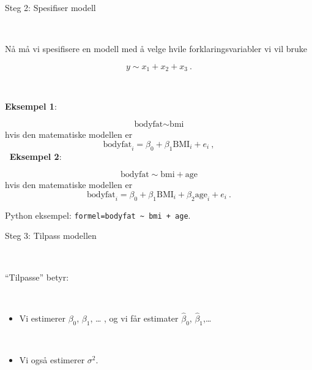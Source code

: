 \documentclass[10pt,ignorenonframetext,]{beamer}
\providecommand{\tightlist}{%
  \setlength{\itemsep}{0pt}\setlength{\parskip}{0pt}}
\begin{document}
\begin{frame}[fragile]

\begin{block}{Steg 2: Spesifiser modell}

\(~\)

Nå må vi spesifisere en modell med å velge hvile forklaringsvariabler vi
vil bruke

\[ y \sim x_1 + x_2 + x_3 \ .\]

\(~\)

\textbf{Eksempel 1}:

\[\text{bodyfat} \sim \text{bmi} \] hvis den matematiske modellen er
\[\text{bodyfat}_i = \beta_0 + \beta_1 \text{BMI}_i + e_i \ , \] \(~\)
\textbf{Eksempel 2}:

\[\text{bodyfat} \sim \text{bmi} + \text{age}\] hvis den matematiske
modellen er
\[\text{bodyfat}_i = \beta_0 + \beta_1 \text{BMI}_i + \beta_2 \text{age}_i + e_i \ . \]

Python eksempel:
\texttt{formel=\textquotesingle{}bodyfat\ \textasciitilde{}\ bmi\ +\ age\textquotesingle{}}.

\end{block}

\end{frame}

\begin{frame}

\begin{block}{Steg 3: Tilpass modellen}

\(~\)

``Tilpasse'' betyr:

\(~\)

\begin{itemize}
\tightlist
\item
  Vi estimerer \(\beta_0\), \(\beta_1\), \ldots{} , og vi får estimater
  \(\hat\beta_0\), \(\hat\beta_1\),\ldots{}
\end{itemize}

\(~\)

\begin{itemize}
\tightlist
\item
  Vi også estimerer \(\sigma^2\).
\end{itemize}

\end{block}

\end{frame}
\end{document}
